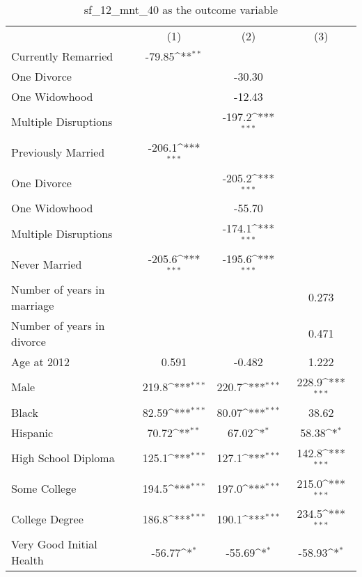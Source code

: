 \begin{table}[htbp]\centering
\def\sym#1{\ifmmode^{#1}\else\(^{#1}\)\fi}
\caption{sf\_12\_mnt\_40 as the outcome variable}
\begin{tabular}{l*{3}{c}}
                &\multicolumn{1}{c}{(1)}         &\multicolumn{1}{c}{(2)}         &\multicolumn{1}{c}{(3)}         \\
Currently Remarried&   -79.85\sym{**} &                  &                  \\
One Divorce     &                  &   -30.30         &                  \\
One Widowhood   &                  &   -12.43         &                  \\
Multiple Disruptions&                  &   -197.2\sym{***}&                  \\
Previously Married&   -206.1\sym{***}&                  &                  \\
One Divorce     &                  &   -205.2\sym{***}&                  \\
One Widowhood   &                  &   -55.70         &                  \\
Multiple Disruptions&                  &   -174.1\sym{***}&                  \\
Never Married   &   -205.6\sym{***}&   -195.6\sym{***}&                  \\
Number of years in marriage&                  &                  &    0.273         \\
Number of years in divorce&                  &                  &    0.471         \\
Age at 2012     &    0.591         &   -0.482         &    1.222         \\
Male            &    219.8\sym{***}&    220.7\sym{***}&    228.9\sym{***}\\
Black           &    82.59\sym{***}&    80.07\sym{***}&    38.62         \\
Hispanic        &    70.72\sym{**} &    67.02\sym{*}  &    58.38\sym{*}  \\
High School Diploma&    125.1\sym{***}&    127.1\sym{***}&    142.8\sym{***}\\
Some College    &    194.5\sym{***}&    197.0\sym{***}&    215.0\sym{***}\\
College Degree  &    186.8\sym{***}&    190.1\sym{***}&    234.5\sym{***}\\
Very Good Initial Health&   -56.77\sym{*}  &   -55.69\sym{*}  &   -58.93\sym{*}  \\

\end{tabular}
\end{table}
